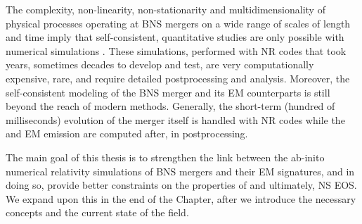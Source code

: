 The complexity, non-linearity, non-stationarity and multidimensionality of physical 
processes operating at \ac{BNS} mergers on a wide range of scales of length and time 
imply that self-consistent, quantitative studies are only possible with numerical 
simulations 
\citep{Sekiguchi:2011zd,Wanajo:2014wha,Foucart:2015gaa,Palenzuela:2015dqa,
    Radice:2017zta,Fujibayashi:2017puw,Radice:2018pdn}.
%
These simulations, performed with \ac{NR} codes that took years, sometimes 
decades to develop and test, are very computationally expensive, rare, and require detailed 
postprocessing and analysis. 
%
Moreover, the self-consistent modeling of the \ac{BNS} merger and its \ac{EM} counterparts 
is still beyond the reach of modern methods. Generally, the short-term (hundred of milliseconds) 
evolution of the merger itself is handled with \ac{NR} codes while the 
\nuc{} and \ac{EM} emission are computed after, in postprocessing. 
%

%
The main goal of this thesis is to strengthen the link between the ab-inito 
numerical relativity simulations of \ac{BNS} mergers and their 
\ac{EM} signatures, 
and in doing so, provide better constraints on the properties of \GW{} 
and ultimately, \ac{NS} \ac{EOS}. 
We expand upon this in the end of the Chapter, after we introduce the necessary 
concepts and the current state of the field. 



